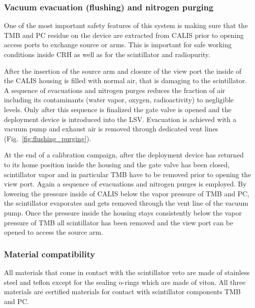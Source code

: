 \subsubsection*{Vacuum evacuation (flushing) and nitrogen purging}
One of the most important safety features of this system is making sure that the TMB and PC residue on the device are extracted from CALIS prior to opening access ports to exchange source or arms. This is  important for safe working conditions inside CRH as well as for the scintillator and radiopurity. 

After the insertion of the source arm and closure of the view port the inside of the CALIS housing is filled with normal air, that is damaging to the scintillator. A sequence of evacuations and nitrogen purges reduces the fraction of air including its contaminants (water vapor, oxygen, radioactivity) to negligible levels. Only after this sequence is finalized the gate valve is opened and the deployment device is introduced into the LSV. Evacuation is achieved with a vacuum pump and exhaust air is removed through dedicated vent lines (Fig.~\ref{fig:flushing_purging}).

At the end of a calibration campaign, after the deployment device has returned to its home position inside the housing and the gate valve has been closed, scintillator vapor and in particular TMB have to be removed prior to opening the view port. Again a sequence of evacuations and nitrogen purges is employed. By lowering the pressure inside of CALIS below the vapor pressure of TMB and PC, the scintillator evaporates and gets removed through the vent line of the vacuum pump. Once the pressure inside the housing stays consistently below the vapor pressure of TMB all scintillator has been removed and the view port can be opened to access the source arm.
 

\subsubsection*{Material compatibility}
All materials that come in contact with the scintillator veto are made of stainless steel and teflon except for the sealing o-rings which are made of viton.  All three materials are certified materials for contact with scintillator components TMB and PC.

